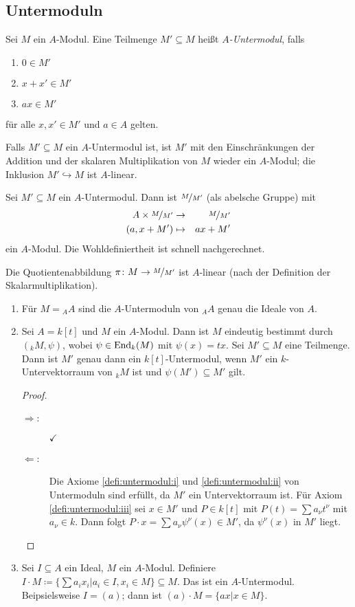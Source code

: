 \documentclass[12pt,a4paper]{scrartcl}
\theoremstyle{cplain}
\theoremstyle{cdef}
\begin{document}
\subsection{Untermoduln}
\begin{defi}
	Sei $M$ ein $A$-Modul. Eine Teilmenge $M'\subseteq M$ heißt \emph{$A$-Untermodul}, falls
	\begin{enumerate}
		\item $0\in M'$ \label{defi:untermodul:i}
		\item $x+x'\in M'$ \label{defi:untermodul:ii}
		\item $ax\in M'$ \label{defi:untermodul:iii}
    \end{enumerate}
    für alle $x,x' \in M'$ und $a \in A$ gelten.

	Falls $M'\subseteq M$ ein $A$-Untermodul ist, ist $M'$ mit den Einschränkungen der Addition und der skalaren Multiplikation von $M$ wieder ein $A$-Modul; die Inklusion $M'\hookrightarrow M$ ist $A$-linear.
	
	Sei $M'\subseteq M$ ein $A$-Untermodul. Dann ist $\nicefrac{M}{M'}$ (als abelsche Gruppe) mit 
	\begin{eqnarray*}
		A\times \nicefrac{M}{M'} & \to & \nicefrac{M}{M'}\\
		(a, x+M') &\mapsto& ax + M'
	\end{eqnarray*}
	ein $A$-Modul. Die Wohldefiniertheit ist schnell nachgerechnet.
	
	Die Quotientenabbildung $\pi\colon M\to \nicefrac{M}{M'}$ ist $A$-linear (nach der Definition der Skalarmultiplikation).
\end{defi}
\begin{bsp}
	\leavevmode
	\begin{enumerate}
		\item Für $M = {}_AA$ sind die $A$-Untermoduln von ${}_AA$ genau die Ideale von $A$.
		\item Sei $A = k[t]$ und $M$ ein $A$-Modul. Dann ist $M$ eindeutig bestimmt durch $({}_kM, \psi)$, wobei $\psi\in\operatorname{End}_k(M)$ mit $\psi(x) = tx$. Sei $M'\subseteq M$ eine Teilmenge. Dann ist $M'$ genau dann ein $k[t]$-Untermodul, wenn $M'$ ein $k$-Untervektorraum von ${}_kM$ ist und $\psi(M')\subseteq M'$ gilt.
		\begin{proof}
		\leavevmode
		\begin{description}
			\item[\glqq $\Rightarrow$\grqq:] $\checkmark$
			\item[\glqq $\Leftarrow$\grqq:]
            Die Axiome \ref{defi:untermodul:i} und \ref{defi:untermodul:ii} von Untermoduln sind erfüllt, da $M'$ ein Untervektorraum ist. Für Axiom \ref{defi:untermodul:iii} sei $x\in M'$ und $P\in k[t]$ mit $P(t) = \sum a_\nu t^\nu$ mit $a_\nu\in k$. Dann folgt $P\cdot x = \sum a_\nu\psi^\nu(x)\in M'$, da $\psi^\nu(x)$ in $M'$ liegt.
            \qedhere
		\end{description}
		\end{proof}
		\item Sei $I\subseteq A$ ein Ideal, $M$ ein $A$-Modul. Definiere $I\cdot M \coloneqq \{\sum a_ix_i|a_i\in I, x_i\in M\}\subseteq M$. Das ist ein $A$-Untermodul. Beipsielsweise $I = (a)$; dann ist $(a)\cdot M = \{ax|x\in M\}$.
	\end{enumerate}
\end{bsp}
\end{document}
